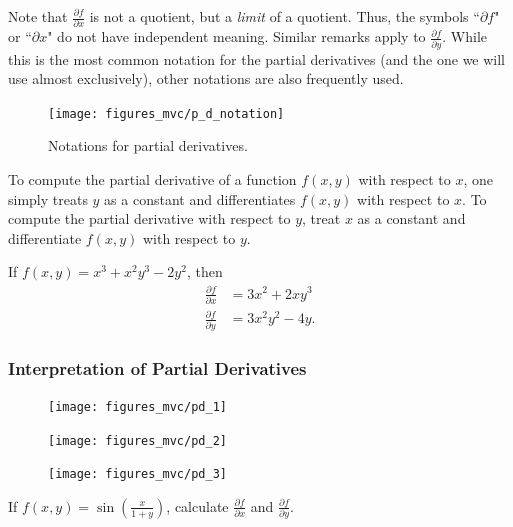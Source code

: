 \documentclass[12pt,letterpaper,reqno]{article}
\numberwithin{equation}{section}
\begin{document}
{\begin{remark}
Note that $\frac{\partial f}{\partial x}$ is not a quotient, but a \emph{limit} of a quotient. Thus, the symbols ``$\partial f$" or ``$\partial x$" do not have independent meaning. Similar remarks apply to $\frac{\partial f}{\partial y}$. While this is the most common notation for the partial derivatives (and the one we will use almost exclusively), other notations are also frequently used.
\end{remark}
\begin{figure}[h]
	\begin{center}
	\texttt{[image: figures\_mvc/p\_d\_notation]}
\end{center}
\caption{Notations for partial derivatives.}
\end{figure}
To compute the partial derivative of a function $f(x,y)$ with respect to $x$, one simply treats $y$ as a constant and differentiates $f(x,y)$ with respect to $x$. To compute the partial derivative with respect to $y$, treat $x$ as a constant and differentiate $f(x,y)$ with respect to $y$.

\begin{example}
If $f(x,y)=x^3+x^2y^3-2y^2$, then
\begin{align*}
	\frac{\partial f}{\partial x}&=3x^2+2xy^3 \\
	\frac{\partial f}{\partial y}&=3x^2y^2-4y.
\end{align*}	
\end{example}
\newpage

\subsubsection{Interpretation of Partial Derivatives}

\begin{figure}[h]
	\begin{center}
		\texttt{[image: figures\_mvc/pd\_1]}
	\end{center}
\end{figure}

\begin{figure}[h]
	\begin{center}
		\texttt{[image: figures\_mvc/pd\_2]}
	\end{center}
\end{figure}

\begin{figure}[h]
	\begin{center}
		\texttt{[image: figures\_mvc/pd\_3]}
	\end{center}
\end{figure}
\newpage 
\begin{exercise}
If $f(x,y)=\sin\left(\frac{x}{1+y}\right)$, calculate $\frac{\partial f}{\partial x}$ and $\frac{\partial f}{\partial y}$.
\end{exercise}

}
\end{document}
